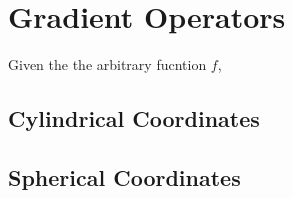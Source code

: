 \chapter{Gradient Operators}
\begin{comment}
\end{comment}
Given the the arbitrary fucntion $f$,
\begin{comment}
\end{comment}
\section{Cylindrical Coordinates}
\begin{comment}
\end{comment}
\section{Spherical Coordinates}
\begin{comment}
\end{comment}
